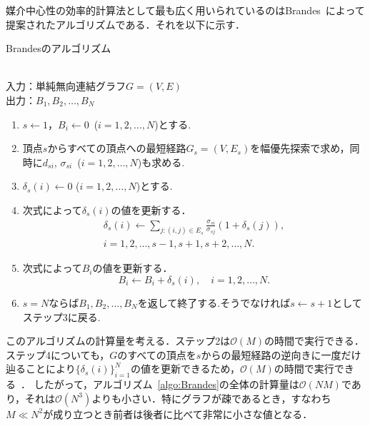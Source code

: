 媒介中心性の効率的計算法として最も広く用いられているのはBrandes~\cite{Brandes2001}によって提案されたアルゴリズムである．それを以下に示す．

\begin{algorithm}[H]
  \caption{Brandesのアルゴリズム}
\label{algo:Brandes}
\rm \ \\
入力：単純無向連結グラフ$G=(V,E)$\\
出力：$B_1,B_2,\ldots,B_N$
{\renewcommand{\labelenumi}{\arabic{enumi}.}
\begin{enumerate}
\item $s\leftarrow 1$，$B_i \leftarrow 0$\ ($i=1,2,\ldots,N$)とする.
%
\item 頂点$s$からすべての頂点への最短経路$G_s=(V,E_s)$を幅優先探索で求め，同時に$d_{si}$, $\sigma_{si}$\ ($i=1,2,\ldots,N$)も求める. 
%
\item $\delta_s(i) \leftarrow 0$ ($i=1,2,\ldots,N$)とする. 
%
\item 次式によって$\delta_s(i)$の値を更新する．
\begin{multline*}
\delta_s(i)\leftarrow \sum_{j:(i,j)\in E_s} \frac{\sigma_{si}}{\sigma_{sj}}(1+\delta_s(j)), 
\\ i=1,2,\ldots,s-1,s+1,s+2,\ldots,N.
\end{multline*}
%
\item 次式によって$B_i$の値を更新する．
\begin{equation*}
B_i \leftarrow B_i+\delta_s(i), \quad i=1,2,\ldots,N.
\end{equation*}
%
\item $s=N$ならば$B_1,B_2,\ldots,B_N$を返して終了する.そうでなければ$s\leftarrow s+1$としてステップ3に戻る. 
\end{enumerate}
}
\end{algorithm}

このアルゴリズムの計算量を考える．ステップ2は$\mathcal{O}(M)$の時間で実行できる．
ステップ4についても，$G$のすべての頂点を$s$からの最短経路の逆向きに一度だけ辿ることにより$\{\delta_s(i)\}_{i=1}^N$の値を更新できるため，$\mathcal{O}(M)$の時間で実行できる~\cite{Brandes2001}．
したがって，アルゴリズム~\ref{algo:Brandes}の全体の計算量は$\mathcal{O}(NM)$であり，それは$\mathcal{O}(N^3)$よりも小さい．特にグラフが疎であるとき，すなわち$M \ll N^2$が成り立つとき前者は後者に比べて非常に小さな値となる．
